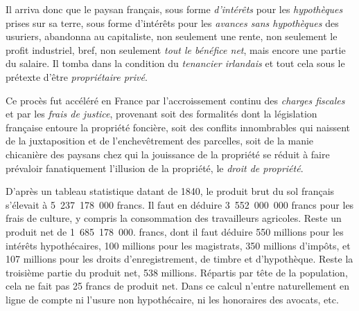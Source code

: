 \documentclass[twoside]{book} %
\begin{document}
Il arriva donc que le paysan français, sous forme \emph{d’intérêts} pour les \emph{hypothèques} prises sur sa terre, sous forme d’intérêts pour les \emph{avances sans hypothèques} des usuriers, abandonna au capitaliste, non seulement une rente, non seulement le profit industriel, bref, non seulement \emph{tout le bénéfice net}, mais encore une partie du salaire. Il tomba dans la condition du \emph{tenancier irlandais} et tout cela sous le prétexte d’être \emph{propriétaire privé}.\par
Ce procès fut accéléré en France par l’accroissement continu des \emph{charges fiscales} et par les \emph{frais de justice}, provenant soit des formalités dont la législation française entoure la propriété foncière, soit des conflits innombrables qui naissent de la juxtaposition et de l’enchevêtrement des parcelles, soit de la manie chicanière des paysans chez qui la jouissance de la propriété se réduit à faire prévaloir fanatiquement l’illusion de la propriété, le \emph{droit de propriété}.\par
D’après un tableau statistique datant de 1840, le produit brut du sol français s’élevait à 5 237 178 000 francs. Il faut en déduire 3 552 000 000 francs pour les frais de culture, y compris la consommation des travailleurs agricoles. Reste un produit net de 1 685 178 000. francs, dont il faut déduire 550 millions pour les intérêts hypothécaires, 100 millions pour les magistrats, 350 millions d’impôts, et 107 millions pour les droits d’enregistrement, de timbre et d’hypothèque. Reste la troisième partie du produit net, 538 millions. Répartis par tête de la population, cela ne fait pas 25 francs de produit net. Dans ce calcul n’entre naturellement en ligne de compte ni l’usure non hypothécaire, ni les honoraires des avocats, etc.\par
\end{document}
